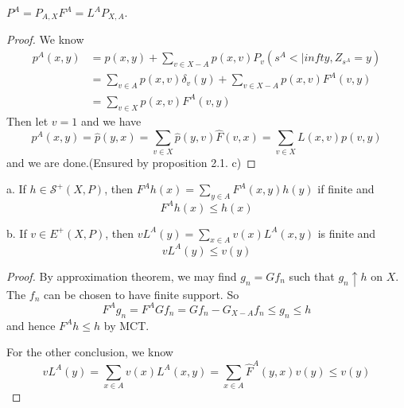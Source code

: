 \documentclass[lang=en,11pt,a4paper,citestyle =authoryear]{elegantpaper}
\newcommand{\Sar}{\mathcal{S}}
\begin{document}
\begin{lemma}
    $P^A = P_{A,X}F^A = L^AP_{X,A}$.
\end{lemma}
\begin{proof}
    We know
    \[
    \begin{aligned}
        p^A(x,y) &= p(x,y) + \sum_{v\in X-A}p(x,v)P_v(s^A<|infty, Z_{s^A} = y) \\
        &=\sum\limits_{v\in A}p(x,v)\delta_v(y) + \sum\limits_{v\in X-A}p(x,v)F^A(v,y) \\
        &= \sum\limits_{v\in X}p(x,v)F^A(v,y)
    \end{aligned}
    \]
    Then let $v = 1$ and we have
    \[
    p^A(x,y) = \hat{p}(y,x) = \sum_{v\in X}\hat{p}(y,v)\hat{F}(v,x) = \sum\limits_{v\in X} L(x,v)p(v,y) 
    \]
    and we are done.(Ensured by proposition 2.1. c)
\end{proof}

\begin{lemma}
    a. If $h\in\Sar^+(X,P)$, then $F^Ah(x) = \sum_{y\in A} F^A(x,y)h(y)$ if finite and
    \[F^Ah(x) \leq h(x)\]\par
    b. If $v\in E^+(X,P)$, then $vL^A(y) = \sum_{x\in A}v(x)L^A(x,y)$ is finite and
    \[vL^A(y) \leq v(y)\]
\end{lemma}
\begin{proof}
    By approximation theorem, we may find $g_n = Gf_n$ such that $g_n \uparrow h$ on $X$. The $f_n$ can be chosen to have finite support. So
    \[
    F^Ag_n = F^AGf_n = Gf_n - G_{X-A}f_n \leq g_n \leq h
    \]
    and hence $F^Ah \leq h$ by MCT.\par
    For the other conclusion, we know 
    \[
    vL^A(y) = \sum_{x\in A}v(x)L^A(x,y) = \sum_{x\in A}\hat{F}^A(y,x)v(y) \leq v(y)
    \]
\end{proof}
\end{document}
